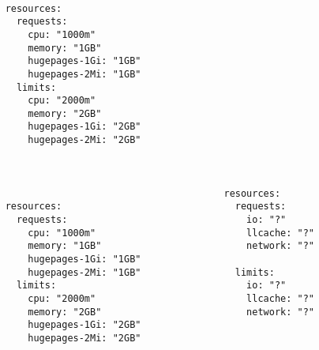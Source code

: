 \documentclass[usenames,dvipsnames, 18pt, compress, aspectratio=169]{beamer}
\begin{document}
\begin{frame}[fragile]{}
    \frametitle{}
    \begin{columns}
        \begin{column}{0.48\columnwidth}
        \begin{verbatim}

    resources:
      requests:
        cpu: "1000m"
        memory: "1GB"
        hugepages-1Gi: "1GB"
        hugepages-2Mi: "1GB"
      limits:
        cpu: "2000m"
        memory: "2GB"
        hugepages-1Gi: "2GB"
        hugepages-2Mi: "2GB"
        \end{verbatim}
        \end{column}

        \begin{column}{0.48\columnwidth}
            \vspace*{-2.5em}
            \begin{center}
            \fontsize{28pt}{30}
            \end{center}
        \end{column}

    \end{columns}
\end{frame}

\begin{frame}[fragile]{}
    \frametitle{}
    \begin{columns}
        \begin{column}{0.48\columnwidth}
        \begin{verbatim}

    resources:
      requests:
        cpu: "1000m"
        memory: "1GB"
        hugepages-1Gi: "1GB"
        hugepages-2Mi: "1GB"
      limits:
        cpu: "2000m"
        memory: "2GB"
        hugepages-1Gi: "2GB"
        hugepages-2Mi: "2GB"
        \end{verbatim}
        \end{column}

        \begin{column}{0.48\columnwidth}
            \begin{center}
            \begin{verbatim}
resources:
  requests:
    io: "?"
    llcache: "?"
    network: "?"

  limits:
    io: "?"
    llcache: "?"
    network: "?"

            \end{verbatim}
            \end{center}
        \end{column}

    \end{columns}
\end{frame}
\end{document}

